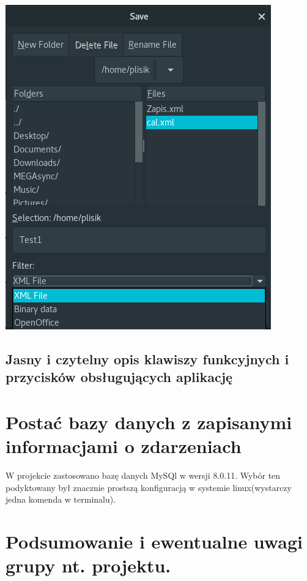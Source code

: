 \documentclass[a4paper,12pt]{article}
\begin{document}
\begin{minipage}{\textwidth}

    \includegraphics[width=\textwidth]{./screen/AppScreen/SaveToAll.png}
    \label{MainViewLinux}

\end{minipage}

\subsection{Jasny i czytelny opis klawiszy funkcyjnych i przycisków obsługujących aplikację}
\section{Postać bazy danych z zapisanymi informacjami o zdarzeniach}
W projekcie zastosowano bazę danych MySQl w wersji 8.0.11. Wybór ten podyktowany był znacznie prostszą konfiguracją w systemie linux(wystarczy jedna komenda w terminalu).

\section{Podsumowanie i ewentualne uwagi grupy nt. projektu. }
\end{document}
